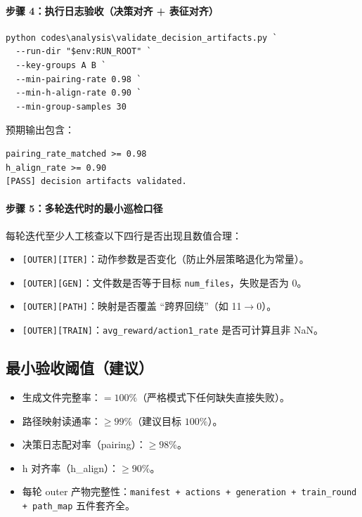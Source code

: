 \documentclass[UTF8,11pt,a4paper]{ctexart}
\begin{document}
\paragraph{步骤 4：执行日志验收（决策对齐 + 表征对齐）}
\begin{verbatim}
python codes\analysis\validate_decision_artifacts.py `
  --run-dir "$env:RUN_ROOT" `
  --key-groups A B `
  --min-pairing-rate 0.98 `
  --min-h-align-rate 0.90 `
  --min-group-samples 30
\end{verbatim}
预期输出包含：
\begin{verbatim}
pairing_rate_matched >= 0.98
h_align_rate >= 0.90
[PASS] decision artifacts validated.
\end{verbatim}

\paragraph{步骤 5：多轮迭代时的最小巡检口径}
每轮迭代至少人工核查以下四行是否出现且数值合理：
\begin{itemize}
\item \texttt{[OUTER][ITER]}：动作参数是否变化（防止外层策略退化为常量）。
\item \texttt{[OUTER][GEN]}：文件数是否等于目标 \texttt{num\_files}，失败是否为 0。
\item \texttt{[OUTER][PATH]}：映射是否覆盖 ``跨界回绕''（如 11$\to$0）。
\item \texttt{[OUTER][TRAIN]}：\texttt{avg\_reward/action1\_rate} 是否可计算且非 NaN。
\end{itemize}

\subsection{最小验收阈值（建议）}
\begin{itemize}
\item 生成文件完整率：$=100\%$（严格模式下任何缺失直接失败）。
\item 路径映射读通率：$\ge 99\%$（建议目标 $100\%$）。
\item 决策日志配对率（pairing）：$\ge 98\%$。
\item h 对齐率（h\_align）：$\ge 90\%$。
\item 每轮 outer 产物完整性：\texttt{manifest + actions + generation + train\_round + path\_map} 五件套齐全。
\end{itemize}
\end{document}
